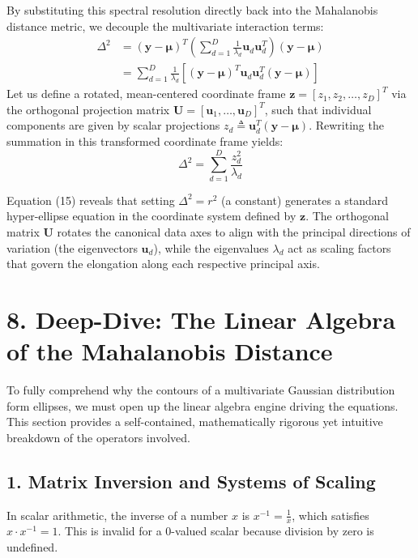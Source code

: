 \documentclass{article}
\begin{document}
By substituting this spectral resolution directly back into the Mahalanobis distance metric, we decouple the multivariate interaction terms:
\begin{align*}
\Delta^2 &= (\mathbf{y} - \boldsymbol{\mu})^T \left( \sum_{d=1}^D \frac{1}{\lambda_d} \mathbf{u}_d \mathbf{u}_d^T \right) (\mathbf{y} - \boldsymbol{\mu}) \\
&= \sum_{d=1}^D \frac{1}{\lambda_d} \left[ (\mathbf{y} - \boldsymbol{\mu})^T \mathbf{u}_d \mathbf{u}_d^T (\mathbf{y} - \boldsymbol{\mu}) \right]
\end{align*}
Let us define a rotated, mean-centered coordinate frame $\mathbf{z} = [z_1, z_2, \dots, z_D]^T$ via the orthogonal projection matrix $\mathbf{U} = [\mathbf{u}_1, \dots, \mathbf{u}_D]^T$, such that individual components are given by scalar projections $z_d \triangleq \mathbf{u}_d^T(\mathbf{y} - \boldsymbol{\mu})$. Rewriting the summation in this transformed coordinate frame yields:
\begin{equation}
\Delta^2 = \sum_{d=1}^D \frac{z_d^2}{\lambda_d} \tag{15}
\end{equation}

Equation (15) reveals that setting $\Delta^2 = r^2$ (a constant) generates a standard hyper-ellipse equation in the coordinate system defined by $\mathbf{z}$. The orthogonal matrix $\mathbf{U}$ rotates the canonical data axes to align with the principal directions of variation (the eigenvectors $\mathbf{u}_d$), while the eigenvalues $\lambda_d$ act as scaling factors that govern the elongation along each respective principal axis.

\section*{8. Deep-Dive: The Linear Algebra of the Mahalanobis Distance}

To fully comprehend why the contours of a multivariate Gaussian distribution form ellipses, we must open up the linear algebra engine driving the equations. This section provides a self-contained, mathematically rigorous yet intuitive breakdown of the operators involved.

\subsection*{1. Matrix Inversion and Systems of Scaling}
In scalar arithmetic, the inverse of a number $x$ is $x^{-1} = \frac{1}{x}$, which satisfies $x \cdot x^{-1} = 1$. This is invalid for a 0-valued scalar because division by zero is undefined. 
\end{document}
